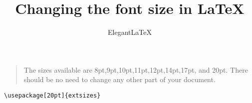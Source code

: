 \documentclass[a4paper]{article}
\title{\bfseries Changing the font size in  \LaTeX{}}
\author{Elegant\LaTeX{}}
\begin{document}
\maketitle

\begin{quote}
The sizes available are 8pt,9pt,10pt,11pt,12pt,14pt,17pt, and 20pt. There should be no need to change any other part of your document.
\end{quote}

\begin{verbatim}
\usepackage[20pt]{extsizes}
\end{verbatim}

\lipsum[3]
\end{document}

